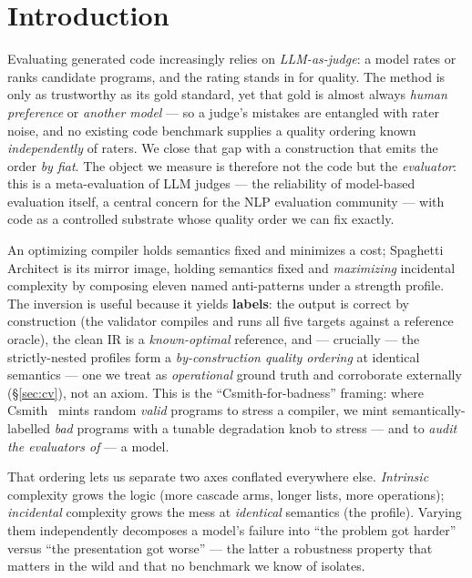 \documentclass[11pt]{article}
\begin{document}
\section{Introduction}
Evaluating generated code increasingly relies on \emph{LLM-as-judge}: a model rates or
ranks candidate programs, and the rating stands in for quality. The method is only as
trustworthy as its gold standard, yet that gold is almost always \emph{human preference}
or \emph{another model} --- so a judge's mistakes are entangled with rater noise, and no
existing code benchmark supplies a quality ordering known \emph{independently} of raters.
We close that gap with a construction that emits the order \emph{by fiat}. The object we
measure is therefore not the code but the \emph{evaluator}: this is a meta-evaluation of
LLM judges --- the reliability of model-based evaluation itself, a central concern for the
NLP evaluation community --- with code as a controlled substrate whose quality order we
can fix exactly.

An optimizing compiler holds semantics fixed and minimizes a cost; Spaghetti Architect is
its mirror image, holding semantics fixed and \emph{maximizing} incidental complexity by
composing eleven named anti-patterns under a strength profile. The inversion is useful
because it yields \textbf{labels}: the output is correct by construction (the validator
compiles and runs all five targets against a reference oracle), the clean IR is a
\emph{known-optimal} reference, and --- crucially --- the strictly-nested profiles form a
\emph{by-construction quality ordering} at identical semantics --- one we treat as
\emph{operational} ground truth and corroborate externally (\S\ref{sec:cv}), not an axiom.
This is the ``Csmith-for-badness''
framing: where Csmith~\citep{yang-etal-2011-finding} mints random \emph{valid} programs to stress a
compiler, we mint semantically-labelled \emph{bad} programs with a tunable degradation
knob to stress --- and to \emph{audit the evaluators of} --- a model.

That ordering lets us separate two axes conflated everywhere else. \emph{Intrinsic}
complexity grows the logic (more cascade arms, longer lists, more operations);
\emph{incidental} complexity grows the mess at \emph{identical} semantics (the profile).
Varying them independently decomposes a model's failure into ``the problem got harder''
versus ``the presentation got worse'' --- the latter a robustness property that matters in
the wild and that no benchmark we know of isolates.
\end{document}
